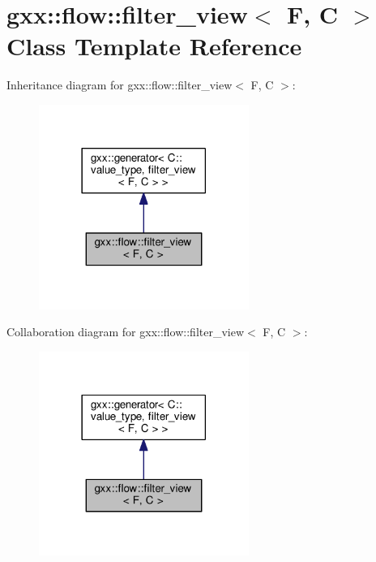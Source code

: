 \hypertarget{classgxx_1_1flow_1_1filter__view}{}\section{gxx\+:\+:flow\+:\+:filter\+\_\+view$<$ F, C $>$ Class Template Reference}
\label{classgxx_1_1flow_1_1filter__view}


Inheritance diagram for gxx\+:\+:flow\+:\+:filter\+\_\+view$<$ F, C $>$\+:
\nopagebreak
\begin{figure}[H]
\begin{center}
\leavevmode
\includegraphics[width=194pt]{classgxx_1_1flow_1_1filter__view__inherit__graph}
\end{center}
\end{figure}


Collaboration diagram for gxx\+:\+:flow\+:\+:filter\+\_\+view$<$ F, C $>$\+:
\nopagebreak
\begin{figure}[H]
\begin{center}
\leavevmode
\includegraphics[width=194pt]{classgxx_1_1flow_1_1filter__view__coll__graph}
\end{center}
\end{figure}
